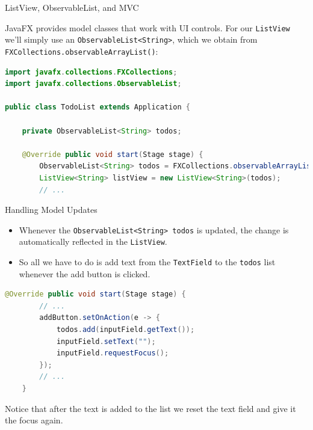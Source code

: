 \documentclass{beamer}
\begin{document}
\begin{frame}[fragile]{ListView, ObservableList, and MVC}

JavaFX provides model classes that work with UI controls.  For our {\tt ListView} we'll simply use an {\tt ObservableList<String>}, which we obtain from {\tt FXCollections.observableArrayList()}:
\begin{lstlisting}[language=Java]
import javafx.collections.FXCollections;
import javafx.collections.ObservableList;

public class TodoList extends Application {

    private ObservableList<String> todos;

    @Override public void start(Stage stage) {
        ObservableList<String> todos = FXCollections.observableArrayList();
        ListView<String> listView = new ListView<String>(todos);
        // ...
\end{lstlisting}


\end{frame}

\begin{frame}[fragile]{Handling Model Updates}

\begin{itemize}
\item Whenever the {\tt ObservableList<String> todos} is updated, the change is automatically reflected in the {\tt ListView}.
\item So all we have to do is add text from the {\tt TextField} to the {\tt todos} list whenever the add button is clicked.
\end{itemize}

\begin{lstlisting}[language=Java]
    @Override public void start(Stage stage) {
        // ...
        addButton.setOnAction(e -> {
            todos.add(inputField.getText());
            inputField.setText("");
            inputField.requestFocus();
        });
        // ...
    }
\end{lstlisting}

Notice that after the text is added to the list we reset the text field and give it the focus again.

\end{frame}
\end{document}
